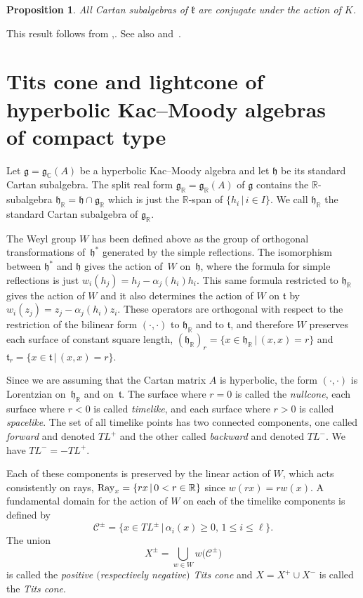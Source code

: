 \documentclass[pdftex]{sigma}
\numberwithin{equation}{section}
\newtheorem{Proposition}[Theorem]{Proposition}
 { \theoremstyle{definition}
\newtheorem{Definition}[Theorem]{Definition}
\newtheorem{Remark}[Theorem]{Remark} }
\def\C{{\mathbb C}}
\def\R{\mathbb{R}}
\def\cC{\mathcal C}
\def\g{\mathfrak{g}}
\def\h{\mathfrak{h}}
\def\k{\mathfrak{k}}
\def\ft{\mathfrak{t}}
\begin{document}
\begin{Proposition}
\label{proposition:Cartancompactconjugate}
All Cartan subalgebras of $\k$ are conjugate under the action of $K$.
\end{Proposition}

This result follows from \cite[Proposition~8.1(iii)]{Caprace09},. See also \cite[Corollary 5.33]{KacWang92} and~\cite[Proposition 3.5]{KacPeterson87}.

\section[Tits cone and lightcone of hyperbolic Kac--Moody algebras of compact type]{Tits cone and lightcone of hyperbolic Kac--Moody algebras\\ of compact type}

Let $\g = \g_\C(A)$ be a hyperbolic Kac--Moody algebra and let $\h$ be its standard Cartan subalgebra.
The split real form $\g_\R = \g_\R(A)$ of $\g$ contains the $\R$-subalgebra $\h_{\R}=\h\cap \g_{\R}$ which is just the $\R$-span of $\{h_i \,|\, i\in I\}$. We call $\h_{\R}$ the standard Cartan subalgebra of $\g_\R$.

The Weyl group $W$ has been defined above as the group of orthogonal transformations of~$\h^*$ generated by the simple reflections. The isomorphism between $\h^*$ and $\h$ gives the action of~$W$ on~$\h$, where the formula for simple reflections is just $w_i(h_j) = h_j - \alpha_j(h_i)h_i$. This same formula restricted to $\h_{\R}$ gives the action of $W$ and it also determines the action of $W$ on $\ft$ by $w_i(z_j) = z_j - \alpha_j(h_i)z_i$. These operators are orthogonal with respect to the restriction of the bilinear form $(\cdot,\cdot)$ to $\h_\R$ and to $\ft$, and therefore $W$ preserves each surface of constant
square length, $(\h_\R)_r = \{x\in\h_\R \, |\, (x,x) = r\}$ and $\ft_r = \{x\in\ft \, |\, (x,x) = r\}$.

Since we are assuming that the Cartan matrix $A$ is hyperbolic, the form $(\cdot,\cdot)$ is Lorentzian on~$\h_\R$ and on~$\ft$. The surface where $r=0$ is called the {\it nullcone}, each surface where $r < 0$ is called {\it timelike}, and each surface where $r > 0$ is
called {\it spacelike}. The set of all timelike points has two connected components, one called {\it forward} and denoted $TL^+$ and the other called {\it backward} and denoted $TL^-$. We have $TL^- = - TL^+$.

Each of these components is preserved by the linear action of $W$, which acts consistently on rays, ${\rm Ray}_x = \{rx\, | \, 0 < r\in\R\}$ since
$w(rx) = r w(x)$. A fundamental domain for the action of $W$ on each of the timelike components is defined by
\[\cC^\pm = \{x\in TL^\pm\, |\, \alpha_i(x) \geq 0,\, 1\leq i\leq \ell \}.\]
The union
\[X^\pm = \bigcup_{w\in W} w\big(\cC^\pm\big)\]
is called the {\it positive $($respectively negative$)$ Tits cone} and $X = X^+\cup X^-$ is called the {\it Tits cone}.
\end{document}
